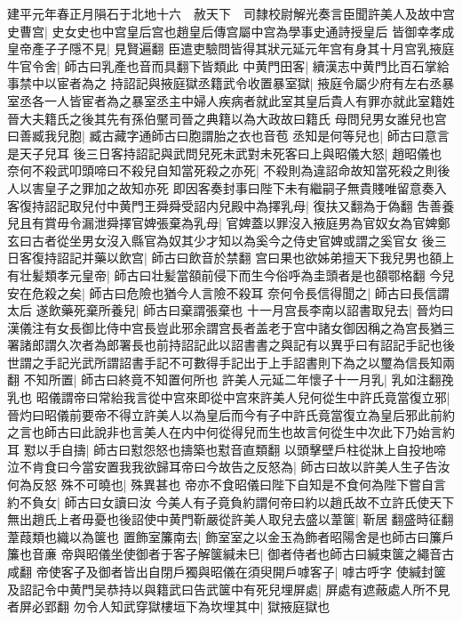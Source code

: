 建平元年春正月隕石于北地十六　赦天下　司隸校尉解光奏言臣聞許美人及故中宫史曹宫|{
	史女史也中宫皇后宫也趙皇后傳宫屬中宫為學事史通詩授皇后}
皆御幸孝成皇帝產子子隱不見|{
	見賢遍翻}
臣遣吏驗問皆得其狀元延元年宫有身其十月宫乳掖庭牛官令舍|{
	師古曰乳產也音而具翻下皆類此}
中黄門田客|{
	續漢志中黄門比百石掌給事禁中以宦者為之}
持詔記與掖庭獄丞籍武令收置暴室獄|{
	掖庭令屬少府有左右丞暴室丞各一人皆宦者為之暴室丞主中婦人疾病者就此室其皇后貴人有罪亦就此室籍姓晉大夫籍氏之後其先有孫伯黶司晉之典籍以為大政故曰籍氏}
母問兒男女誰兒也宫曰善臧我兒胞|{
	臧古藏字通師古曰胞謂胎之衣也音苞}
丞知是何等兒也|{
	師古曰意言是天子兒耳}
後三日客持詔記與武問兒死未武對未死客曰上與昭儀大怒|{
	趙昭儀也}
奈何不殺武叩頭啼曰不殺兒自知當死殺之亦死|{
	不殺則為違詔命故知當死殺之則後人以害皇子之罪加之故知亦死}
即因客奏封事曰陛下未有繼嗣子無貴賤唯留意奏入客復持詔記取兒付中黄門王舜舜受詔内兒殿中為擇乳母|{
	復扶又翻為于偽翻}
吿善養兒且有賞毋令漏泄舜擇官婢張棄為乳母|{
	官婢蓋以罪沒入掖庭男為官奴女為官婢鄭玄曰古者從坐男女沒入縣官為奴其少才知以為奚今之侍史官婢或謂之奚官女}
後三日客復持詔記并藥以飲宫|{
	師古曰飲音於禁翻}
宫曰果也欲姊弟擅天下我兒男也頟上有壮髪類孝元皇帝|{
	師古曰壮髪當頟前侵下而生今俗呼為圭頭者是也頟鄂格翻}
今兒安在危殺之矣|{
	師古曰危險也猶今人言險不殺耳}
奈何令長信得聞之|{
	師古曰長信謂太后}
遂飲藥死棄所養兒|{
	師古曰棄謂張棄也}
十一月宫長李南以詔書取兒去|{
	晉灼曰漢儀注有女長御比侍中宫長豈此邪余謂宫長者盖老于宫中諸女御因稱之為宫長猶三署諸郎謂久次者為郎署長也前持詔記此以詔書書之與記有以異乎曰有詔記手記也後世謂之手記光武所謂詔書手記不可數得手記出于上手詔書則下為之以璽為信長知兩翻}
不知所置|{
	師古曰終竟不知置何所也}
許美人元延二年懷子十一月乳|{
	乳如注翻㝃乳也}
昭儀謂帝曰常紿我言從中宫來即從中宫來許美人兒何從生中許氏竟當復立邪|{
	晉灼曰昭儀前要帝不得立許美人以為皇后而今有子中許氏竟當復立為皇后邪此前約之言也師古曰此說非也言美人在内中何從得兒而生也故言何從生中次此下乃始言約耳}
懟以手自擣|{
	師古曰懟怨怒也擣築也懟音直類翻}
以頭擊壁戶柱從牀上自投地啼泣不肯食曰今當安置我我欲歸耳帝曰今故告之反怒為|{
	師古曰故以許美人生子告汝何為反怒}
殊不可曉也|{
	殊異甚也}
帝亦不食昭儀曰陛下自知是不食何為陛下嘗自言約不負女|{
	師古曰女讀曰汝}
今美人有子竟負約謂何帝曰約以趙氏故不立許氏使天下無出趙氏上者毋憂也後詔使中黄門靳嚴從許美人取兒去盛以葦箧|{
	靳居翻盛時征翻葦葭類也織以為箧也}
置飾室簾南去|{
	飾室室之以金玉為飾者昭陽舍是也師古曰簾戶簾也音亷}
帝與昭儀坐使御者于客子解箧緘未巳|{
	御者侍者也師古曰緘束箧之繩音古咸翻}
帝使客子及御者皆出自閉戶獨與昭儀在須臾開戶嘑客子|{
	嘑古呼字}
使緘封箧及詔記令中黄門吴恭持以與籍武曰告武箧中有死兒埋屏處|{
	屏處有遮蔽處人所不見者屏必郢翻}
勿令人知武穿獄樓垣下為坎埋其中|{
	獄掖庭獄也}
